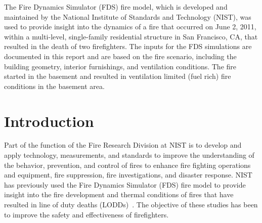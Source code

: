 \documentclass[12pt,oneside]{book}
\begin{document}
The Fire Dynamics Simulator (FDS) fire model, which is developed and maintained by the National Institute of Standards and Technology (NIST), was used to provide insight into the dynamics of a fire that occurred on June 2, 2011, within a multi-level, single-family residential structure in San Francisco, CA, that resulted in the death of two firefighters. The inputs for the FDS simulations are documented in this report and are based on the fire scenario, including the building geometry, interior furnishings, and ventilation conditions. The fire started in the basement and resulted in ventilation limited (fuel rich) fire conditions in the basement area.



\chapter{Introduction}
\label{sec:introduction}

Part of the function of the Fire Research Division at NIST is to develop and apply technology, measurements, and standards to improve the understanding of the behavior, prevention, and control of fires to enhance fire fighting operations and equipment, fire suppression, fire investigations, and disaster response. NIST has previously used the Fire Dynamics Simulator (FDS) fire model to provide insight into the fire development and thermal conditions of fires that have resulted in line of duty deaths (LODDs)~\cite{Madrzykowski:1,Iowa,Texas,Bryner:Charleston,barowy:texas}. The objective of these studies has been to improve the safety and effectiveness of firefighters.
\end{document}
